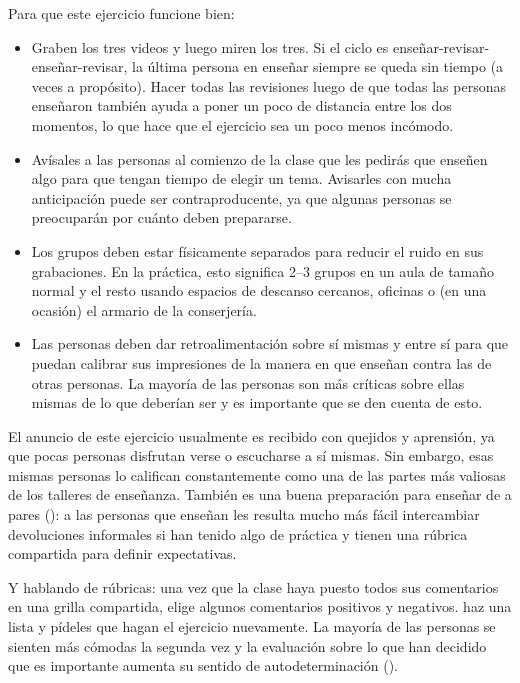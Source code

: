 Para que este ejercicio funcione bien:

\begin{itemize}

\item
  Graben los tres videos y luego miren los tres.
  Si el ciclo es enseñar-revisar-enseñar-revisar,
  la última persona en enseñar siempre se queda sin tiempo
  (a veces a propósito).
  Hacer todas las revisiones luego de que todas las personas enseñaron
  también ayuda a poner un poco de distancia entre los dos momentos,
  lo que hace que el ejercicio sea un poco menos incómodo.

\item
  Avísales a las personas al comienzo de la clase que les pedirás que enseñen algo
  para que tengan tiempo de elegir un tema.
  Avisarles con mucha anticipación puede ser contraproducente,
  ya que algunas personas se preocuparán por cuánto deben prepararse.

\item
  Los grupos deben estar físicamente separados para reducir el ruido en sus grabaciones.
  En la práctica,
  esto significa 2--3 grupos en un aula de tamaño normal
  y el resto usando espacios de descanso cercanos, oficinas
  o (en una ocasión) el armario de la conserjería.

\item
  Las personas deben dar retroalimentación sobre sí mismas y entre sí
  para que puedan calibrar sus impresiones de la manera en que enseñan
  contra las de otras personas.
  La mayoría de las personas son más críticas sobre ellas mismas de lo que deberían ser
  y es importante que se den cuenta de esto.

\end{itemize}

El anuncio de este ejercicio usualmente es recibido con quejidos y aprensión,
ya que pocas personas disfrutan verse o escucharse a sí mismas.
Sin embargo,
esas mismas personas lo califican constantemente como una de las partes más valiosas de los talleres de enseñanza.
También es una buena preparación para enseñar de a pares ():
a las personas que enseñan les resulta mucho más fácil intercambiar devoluciones informales
si han tenido algo de práctica
y tienen una rúbrica compartida para definir expectativas.

Y hablando de rúbricas:
una vez que la clase haya puesto todos sus comentarios en una grilla compartida,
elige algunos comentarios positivos y negativos.
haz una lista
y pídeles que hagan el ejercicio nuevamente.
La mayoría de las personas se sienten más cómodas la segunda vez
y la evaluación sobre lo que han decidido que es importante aumenta su sentido de autodeterminación ().

